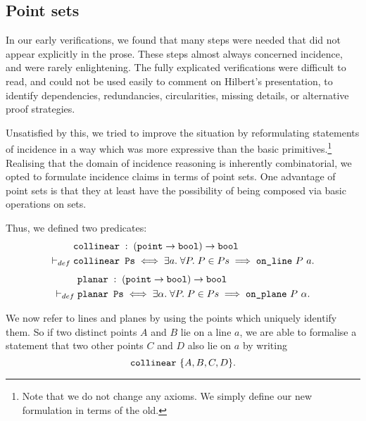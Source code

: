 \subsection{Point sets}
In our early verifications, we found that many steps were needed that did not appear explicitly in the prose. These steps almost always concerned incidence, and were rarely enlightening. The fully explicated verifications were difficult to read, and could not be used easily to comment on Hilbert's presentation, to identify dependencies, redundancies, circularities, missing details, or alternative proof strategies.

Unsatisfied by this, we tried to improve the situation by reformulating statements of incidence in a way which was more expressive than the basic primitives.\footnote{Note that we do not change any axioms. We simply define our new formulation in terms of the old.} Realising that the domain of incidence reasoning is inherently combinatorial, we opted to formulate incidence claims in terms of point sets. One advantage of point sets is that they at least have the possibility of being composed via basic operations on sets.

Thus, we defined two predicates:
\begin{align*}
&\texttt{collinear}\;:\;(\texttt{point}\rightarrow\texttt{bool})\rightarrow\texttt{bool}
\\\vdash_{def}\;&\texttt{collinear\ Ps} \iff \exists a.\; \forall P.\; P \in Ps \implies \texttt{on\_line}\ P\ a.
\end{align*}
\begin{align*}
&\texttt{planar}\;:\;(\texttt{point}\rightarrow\texttt{bool})\rightarrow\texttt{bool}
\\\vdash_{def}\;&\texttt{planar\ Ps} \iff \exists \alpha.\; \forall P.\; P \in Ps \implies \texttt{on\_plane}\ P\ \alpha.
\end{align*}


We now refer to lines and planes by using the points which uniquely identify them. So if two distinct points $A$ and $B$ lie on a line $a$, we are able to formalise a statement that two other points $C$ and $D$ also lie on $a$ by writing
\begin{displaymath}
\texttt{collinear}\ \{A, B, C, D\}.
\end{displaymath}

